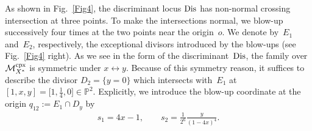 \documentclass[pdftex]{sigma}
\numberwithin{equation}{section}
\begin{document}
As shown in Fig.~\ref{Fig4}, the discriminant locus ${\rm Dis}$ has non-normal crossing intersection at three points. To make the intersections normal, we blow-up successively four times at the two points near the origin~$o$. We denote by~$E_{1}$ and~$E_{2}$, respectively, the exceptional divisors introduced by the blow-ups (see Fig.~\ref{Fig4} right). As we see in the form of the discriminant~${\rm Dis}$, the family over $\mathcal{M}_{X^{*}}^{\rm cpx}$ is symmetric under $x\leftrightarrow y$. Because of this symmetry reason, it suffices to describe the divisor $D_{2}= \{ y=0\} $ which intersects with~$E_{1}$ at $[1,x,y]=\big[1,\frac{1}{4},0\big]\in\mathbb{P}^{2}$. Explicitly, we introduce the blow-up coordinate at the origin $q_{12}:=E_{1}\cap D_{y}$ by
\begin{gather*}
s_{1}=4x-1,\qquad s_{2}=\frac{1}{2^{6}}\frac{y}{(1-4x)^{4}}.
\end{gather*}
\end{document}
